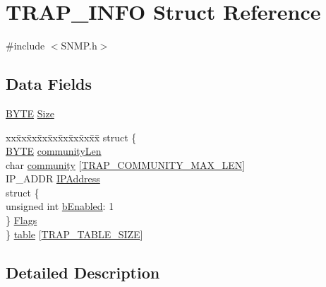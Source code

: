 \hypertarget{struct_t_r_a_p___i_n_f_o}{}\section{T\+R\+A\+P\+\_\+\+I\+N\+F\+O Struct Reference}
\label{struct_t_r_a_p___i_n_f_o}


{\ttfamily \#include $<$S\+N\+M\+P.\+h$>$}

\subsection*{Data Fields}
\begin{DoxyCompactItemize}
\item 
\hyperlink{_generic_type_defs_8h_a4ae1dab0fb4b072a66584546209e7d58}{B\+Y\+T\+E} \hyperlink{struct_t_r_a_p___i_n_f_o_a72a731e6518bee75f8bd1534ad397971}{Size}
\item 
\begin{tabbing}
xx\=xx\=xx\=xx\=xx\=xx\=xx\=xx\=xx\=\kill
struct \{\\
\>\hyperlink{_generic_type_defs_8h_a4ae1dab0fb4b072a66584546209e7d58}{BYTE} \hyperlink{struct_t_r_a_p___i_n_f_o_a1c7f631640a7359d70137a0c41b0099c}{communityLen}\\
\>char \hyperlink{struct_t_r_a_p___i_n_f_o_add1f21718ceba7cec551214a60f232a6}{community} \mbox{[}\hyperlink{_s_n_m_p_8h_a50af256125c237684205bbd60f1a24ed}{TRAP\_COMMUNITY\_MAX\_LEN}\mbox{]}\\
\>IP\_ADDR \hyperlink{struct_t_r_a_p___i_n_f_o_a752c0ed2457a0c6b85437dd48b5c1a59}{IPAddress}\\
\>struct \{\\
\>\>unsigned int \hyperlink{struct_t_r_a_p___i_n_f_o_a4f68a3a20cae308b9abeee38bdb0e7b6}{bEnabled}: 1\\
\>\} \hyperlink{struct_t_r_a_p___i_n_f_o_a52d4473af1591b9de69859139d8c564b}{Flags}\\
\} \hyperlink{struct_t_r_a_p___i_n_f_o_a2e79ee73ee811062ae562aac2ea74c3b}{table} \mbox{[}\hyperlink{_s_n_m_p_8h_aa4a59fc9491be16619e5489252edf5ab}{TRAP\_TABLE\_SIZE}\mbox{]}\\

\end{tabbing}\end{DoxyCompactItemize}


\subsection{Detailed Description}


